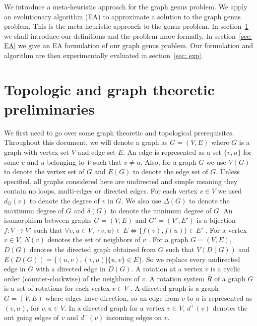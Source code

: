 \documentclass{article}
\begin{document}
    We introduce a meta-heuristic approach for the graph genus problem. We apply an evolutionary algorithm (EA) to approximate a solution to the graph genus problem. 
    This is the meta-heuristic approach to the genus problem. In section~\ref{sec: prelim} we shall introduce our definitions and the problem more formally.
    In section~\ref{sec: EA} we give an EA formulation of our graph genus problem. Our formulation and algorithm are then experimentally evaluated in section~\ref{sec: exp}.

   

\section{Topologic and graph theoretic preliminaries}\label{sec: prelim}
    We first need to go over some graph theoretic and topological prerequisites.
    Throughout this document, we will denote a graph as $G = (V, E)$ where $G$ is a graph with vertex set $V$ and edge set $E$. An edge is represented as a set $\{v, u\}$ for some $v$ and $u$ belonging to $V$ such that $v \neq u$. Also, for a graph $G$ we use $V(G)$ to denote the vertex set of $G$ and $E(G)$ to denote the edge set of $G$. 
    Unless specified, all graphs considered here are undirected and simple meaning they contain no loops, multi-edges or directed edges. 
    For each vertex $v\in V$ we used $d_G(v)$ to denote the degree of $v$ in $G$. We also use $\Delta(G)$ to denote the maximum degree of $G$ and $\delta(G)$ to denote the minimum degree of $G$. 
    An isomorphism between graphs $G = (V, E)$ and $G' = (V', E')$ is a bijection $f : V \to V'$ such that $\forall v, u \in V,\; \{v, u\} \in E \iff  \{f(v), f(u)\} \in E'$ \cite{Diestel97, West01}. For a vertex $v \in V$, $N(v)$ denotes the set of neighbors of $v$ \cite{Diestel97}. 
    For a graph $G = (V, E)$, $D(G)$ denotes the directed graph obtained from $G$ such that $V(D(G))$ and $E(D(G)) = \{(u,v), (v,u)|\{u,v\} \in E\}$. So we replace every undirected edge in $G$ with a directed edge in $D(G)$.
    A rotation at a vertex $v$ is a cyclic order (counter-clockwise) of the neighbors of $v$. A rotation system $R$ of a graph $G$ is a set of rotations for each vertex $v \in V$ \cite{Beyer16}.
    A directed graph is a graph $G  = (V, E)$ where edges have direction, so an edge from $v$ to $u$ is represented as $(v, u)$, for $v,u \in V$. In a directed graph for a vertex $v \in V$, $d^+(v)$ denotes the out going edges of $v$ and $d^-(v)$ incoming edges on $v$.
\end{document}
